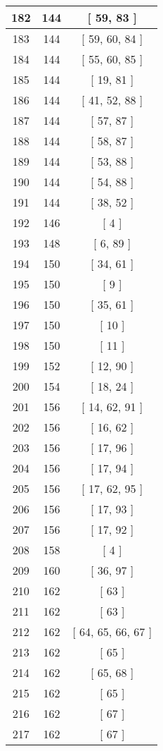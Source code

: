 \begin{center}
\begin{longtable}[H]{|| c c c ||}
\hline
182 & 144 & [ 59, 83 ] \\ 
\hline
183 & 144 & [ 59, 60, 84 ] \\ 
\hline
184 & 144 & [ 55, 60, 85 ] \\ 
\hline
185 & 144 & [ 19, 81 ] \\ 
\hline
186 & 144 & [ 41, 52, 88 ] \\ 
\hline
187 & 144 & [ 57, 87 ] \\ 
\hline
188 & 144 & [ 58, 87 ] \\ 
\hline
189 & 144 & [ 53, 88 ] \\ 
\hline
190 & 144 & [ 54, 88 ] \\ 
\hline
191 & 144 & [ 38, 52 ] \\ 
\hline
192 & 146 & [ 4 ] \\ 
\hline
193 & 148 & [ 6, 89 ] \\ 
\hline
194 & 150 & [ 34, 61 ] \\ 
\hline
195 & 150 & [ 9 ] \\ 
\hline
196 & 150 & [ 35, 61 ] \\ 
\hline
197 & 150 & [ 10 ] \\ 
\hline
198 & 150 & [ 11 ] \\ 
\hline
199 & 152 & [ 12, 90 ] \\ 
\hline
200 & 154 & [ 18, 24 ] \\ 
\hline
201 & 156 & [ 14, 62, 91 ] \\ 
\hline
202 & 156 & [ 16, 62 ] \\ 
\hline
203 & 156 & [ 17, 96 ] \\ 
\hline
204 & 156 & [ 17, 94 ] \\ 
\hline
205 & 156 & [ 17, 62, 95 ] \\ 
\hline
206 & 156 & [ 17, 93 ] \\ 
\hline
207 & 156 & [ 17, 92 ] \\ 
\hline
208 & 158 & [ 4 ] \\ 
\hline
209 & 160 & [ 36, 97 ] \\ 
\hline
210 & 162 & [ 63 ] \\ 
\hline
211 & 162 & [ 63 ] \\ 
\hline
212 & 162 & [ 64, 65, 66, 67 ] \\ 
\hline
213 & 162 & [ 65 ] \\ 
\hline
214 & 162 & [ 65, 68 ] \\ 
\hline
215 & 162 & [ 65 ] \\ 
\hline
216 & 162 & [ 67 ] \\ 
\hline
217 & 162 & [ 67 ] \\ 

\end{longtable}
\end{center}

